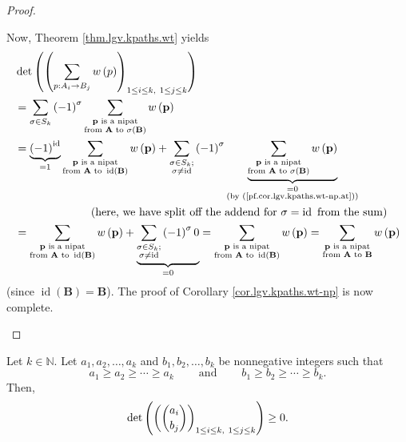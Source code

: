 \begin{proof}
\begin{fineprint}
Now, Theorem \ref{thm.lgv.kpaths.wt} yields%
\begin{align*}
&  \det\left(  \left(  \sum_{p:A_{i}\rightarrow B_{j}}w\left(  p\right)
\right)  _{1\leq i\leq k,\ 1\leq j\leq k}\right) \\
&  =\sum_{\sigma\in S_{k}}\left(  -1\right)  ^{\sigma}\sum
_{\substack{\mathbf{p}\text{ is a nipat}\\\text{from }\mathbf{A}\text{ to
}\sigma\left(  \mathbf{B}\right)  }}w\left(  \mathbf{p}\right) \\
&  =\underbrace{\left(  -1\right)  ^{\operatorname*{id}}}_{=1}\sum
_{\substack{\mathbf{p}\text{ is a nipat}\\\text{from }\mathbf{A}\text{ to
}\operatorname*{id}\left(  \mathbf{B}\right)  }}w\left(  \mathbf{p}\right)
+\sum_{\substack{\sigma\in S_{k};\\\sigma\neq\operatorname*{id}}}\left(
-1\right)  ^{\sigma}\underbrace{\sum_{\substack{\mathbf{p}\text{ is a
nipat}\\\text{from }\mathbf{A}\text{ to }\sigma\left(  \mathbf{B}\right)
}}w\left(  \mathbf{p}\right)  }_{\substack{=0\\\text{(by
(\ref{pf.cor.lgv.kpaths.wt-np.at}))}}}\\
&  \ \ \ \ \ \ \ \ \ \ \ \ \ \ \ \ \ \ \ \ \left(  \text{here, we have split
off the addend for }\sigma=\operatorname*{id}\text{ from the sum}\right) \\
&  =\sum_{\substack{\mathbf{p}\text{ is a nipat}\\\text{from }\mathbf{A}\text{
to }\operatorname*{id}\left(  \mathbf{B}\right)  }}w\left(  \mathbf{p}\right)
+\underbrace{\sum_{\substack{\sigma\in S_{k};\\\sigma\neq\operatorname*{id}%
}}\left(  -1\right)  ^{\sigma}0}_{=0}=\sum_{\substack{\mathbf{p}\text{ is a
nipat}\\\text{from }\mathbf{A}\text{ to }\operatorname*{id}\left(
\mathbf{B}\right)  }}w\left(  \mathbf{p}\right)  =\sum_{\substack{\mathbf{p}%
\text{ is a nipat}\\\text{from }\mathbf{A}\text{ to }\mathbf{B}}}w\left(
\mathbf{p}\right)
\end{align*}
(since $\operatorname*{id}\left(  \mathbf{B}\right)  =\mathbf{B}$). The proof
of Corollary \ref{cor.lgv.kpaths.wt-np} is now complete.
\end{fineprint}
\end{proof}

\begin{corollary}
\label{cor.lgv.binom-det-nonneg}Let $k\in\mathbb{N}$. Let $a_{1},a_{2}%
,\ldots,a_{k}$ and $b_{1},b_{2},\ldots,b_{k}$ be nonnegative integers such
that
\[
a_{1}\geq a_{2}\geq\cdots\geq a_{k}\ \ \ \ \ \ \ \ \ \ \text{and}%
\ \ \ \ \ \ \ \ \ \ b_{1}\geq b_{2}\geq\cdots\geq b_{k}.
\]
Then,%
\[
\det\left(  \left(  \dbinom{a_{i}}{b_{j}}\right)  _{1\leq i\leq k,\ 1\leq
j\leq k}\right)  \geq0.
\]

\end{corollary}

